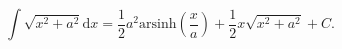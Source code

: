 $$ 
  \int \sqrt{x^2 + a^2} \mathrm{d}x 
  = \frac{1}{2} a^2 \mathrm{arsinh} \left ( \frac{x}{a}
  \right ) + \frac{1}{2} x \sqrt{x^2 + a^2 } + C
  . 
  $$